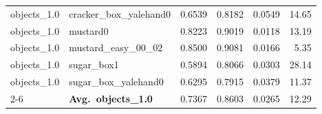 \begin{longtable}{llrrrr}
  objects_1.0 & cracker\_box\_yalehand0 & 0.6539 & 0.8182 & 0.0549 & 14.65 \\
  objects_1.0 & mustard0 & 0.8223 & 0.9019 & 0.0118 & 13.19 \\
  objects_1.0 & mustard\_easy\_00\_02 & 0.8500 & 0.9081 & 0.0166 & 5.35 \\
  objects_1.0 & sugar\_box1 & 0.5894 & 0.8066 & 0.0303 & 28.14 \\
  objects_1.0 & sugar\_box\_yalehand0 & 0.6295 & 0.7915 & 0.0379 & 11.37 \\
  \cmidrule{2-6}
  & \textbf{Avg.~objects_1.0} & 0.7367 & 0.8603 & 0.0265 & 12.29 \\
  \midrule
\bottomrule
\end{longtable}